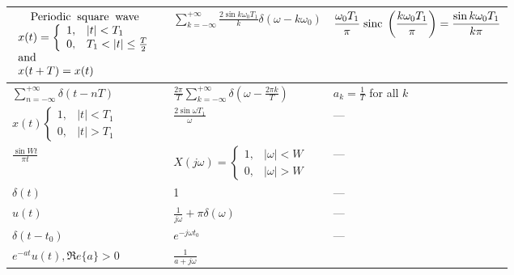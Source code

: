 \documentclass[12pt]{article}
\numberwithin{equation}{section}
\begin{document}
\begin{table}[htb]
\begin{center}
\begin{small}
\begin{tabular}{l|l|l}
  \\ \hline
$\displaystyle
  \begin{array}{l} \;\;\;\;
    {\rm Periodic\;\; square\;\; wave} \\
    x(t) = \left\{
    \begin{array}{ll}
      1, & |t|<T_{1} \\
      0, & T_{1} < |t| \leq \frac{T}{2}
    \end{array}
    \right.
    \\
    {\rm and} \\
    x(t+T) = x(t)
  \end{array}$
  & $\displaystyle \sum^{+\infty}_{k=-\infty} \frac{2\sin k
    \omega_{0}T_{1}}{k}\delta(\omega - k\omega_{0})$
  & $\displaystyle \frac{\omega_{0}T_{1}}{\pi} \; {\rm sinc} \; \left(
    \frac{k \omega_{0} T_{1}}{\pi} \right) = \frac{\sin k \omega_{0}
    T_{1}}{k \pi}$
  \\ \hline
$\displaystyle \sum^{+\infty}_{n=-\infty} \delta(t-nT)$
  & $\displaystyle \frac{2\pi}{T} \sum^{+\infty}_{k=-\infty} \delta
    \left( \omega-\frac{2\pi k}{T} \right)$
  & $\displaystyle a_{k} = \frac{1}{T}$ for all $k$
  \\ \hline
$\displaystyle x(t) \left\{
  \begin{array}{ll}
    1, & |t|<T_{1} \\
    0, & |t|>T_{1}
  \end{array} \right.$
  & $\displaystyle \frac{2\sin\omega T_{1}}{\omega}$
  & \hspace{.25in} ---
  \\ \hline
$\displaystyle \frac{\sin Wt}{\pi t}$
  & $\displaystyle X(j\omega) = \left\{
    \begin{array}{ll}
      1, & |\omega|< W \\
      0, & |\omega|>W
    \end{array} \right.$
  & \hspace{.25in} ---
  \\ \hline
$\delta(t)$
  & 1
  & \hspace{.25in} ---
  \\ \hline
$u(t)$
  & $\displaystyle \frac{1}{j\omega} + \pi\delta(\omega)$
  & \hspace{.25in} ---
  \\ \hline
$\delta(t-t_{0})$
  & $e^{-j\omega t_{0}}$
  & \hspace{.25in} ---
  \\ \hline
$\displaystyle e^{-at}u(t), \Re e\{a\}>0$
  & $\displaystyle \frac{1}{a + j\omega} $

\end{tabular}
\end{small}
\end{center}
\end{table}
\end{document}

